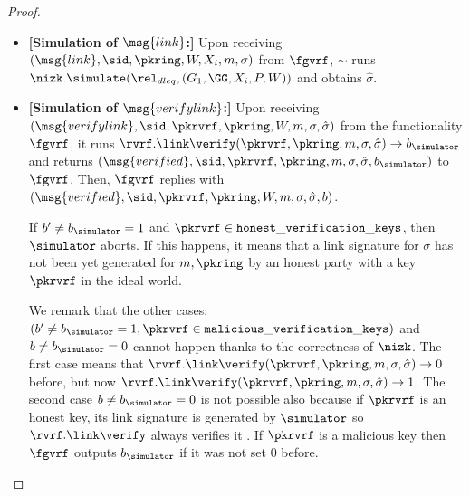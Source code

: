 \begin{proof}
\begin{itemize}
\begin{itemize}
		\end{itemize}
		
		
		
		
		
		\item \textbf{[Simulation of $ \msg{link} $:]} Upon receiving $(\msg{link}, \sid, \pkring, W,X_i, m,  \sigma)$ from $\fgvrf$, $ \sim $ runs $ \nizk.\simulate(\rel_{dleq}, (G_1, \GG,X_i, P,W)) $ and obtains $ \hat{\sigma} $.
		
		
		
		\item \textbf{[Simulation of $ \msg{verifylink} $:]} Upon receiving  $(\msg{verifylink}, \sid, \pkrvrf, \pkring, W,m, \sigma, \hat \sigma)$ from the functionality $\fgvrf$,  it runs $ \rvrf.\link\verify(\pkrvrf,\pkring, m, \sigma,\hat \sigma) \rightarrow b_\simulator $ and  returns $ (\msg{verified}, \sid, \pkrvrf,\pkring, m, \sigma, \hat\sigma, b_\simulator) $ to  $\fgvrf  $. Then, $ \fgvrf $ replies with $ (\msg{verified}, \sid, \pkrvrf,\pkring,W, m, \sigma, \hat\sigma, b) $. 
		
		If $ b' \neq b_\simulator   = 1 $ and $ \pkrvrf \in \mathtt{honest\_verification\_keys} $, then $ \simulator $ aborts. If this happens, it means that a link signature for $ \sigma $ has not been yet generated for $ m, \pkring $ by an honest party with a key $ \pkrvrf $ in the ideal world.
		
		We remark that the other cases:   $ (b' \neq b_\simulator   = 1, \pkrvrf \in \mathtt{malicious\_verification\_keys})$ and  $ b \neq b_\simulator = 0 $ cannot happen thanks to  the correctness of $ \nizk $. The first case  means that $ \rvrf.\link\verify(\pkrvrf,\pkring, m, \sigma,\hat \sigma) \rightarrow 0$ before, but now $  \rvrf.\link\verify(\pkrvrf,\pkring, m, \sigma,\hat \sigma) \rightarrow 1 $.  
		The second case $ b \neq b_\simulator = 0 $ is not possible also because if $ \pkrvrf $ is an honest key, its link signature is generated by $ \simulator $ so $ \rvrf.\link\verify $ always verifies it . If $ \pkrvrf $ is a malicious key then $ \fgvrf $ outputs  $ b_\simulator $ if it was not set 0 before. 
		

\end{itemize}
\end{proof}
